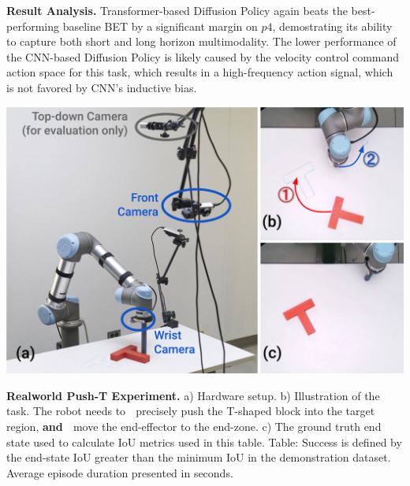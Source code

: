 \textbf{Result Analysis.} Transformer-based Diffusion Policy again beats the best-performing baseline BET \cite{bet} by a significant margin on $p4$, demostrating its ability to capture both short and long horizon multimodality. The lower performance of the CNN-based Diffusion Policy is likely caused by the velocity control command action space for this task, which results in a high-frequency action signal, which is not favored by CNN's inductive bias.

\begin{table}[t]
\centering
\includegraphics[width=0.9\linewidth]{figure/real_task_setup.pdf}

\vspace{2mm}


\caption{\textbf{Realworld Push-T Experiment.}
\label{tab:real_pusht}
a) Hardware setup.
b) Illustration of the task. The robot needs to \textcircled{} precisely push the T-shaped block into the target region, \textbf{and} \textcircled{} move the end-effector to the end-zone.
c) The ground truth end state used to calculate IoU metrics used in this table. Table: Success is defined by the end-state IoU greater than the minimum IoU in the demonstration dataset. Average episode duration presented in seconds.}
\end{table}



